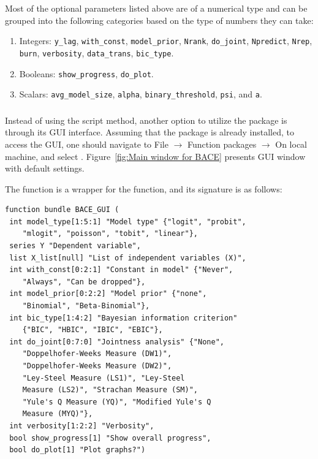 Most of the optional parameters listed above are of
a numerical type and can be grouped into the following
categories based on the type of numbers they can take:
\begin{enumerate}
	\item Integers: \lstinline!y_lag!, \lstinline!with_const!,
		\lstinline!model_prior!, \lstinline!Nrank!,
		\lstinline!do_joint!, \lstinline!Npredict!,
		\lstinline!Nrep!, \lstinline!burn!, \lstinline!verbosity!,
		\lstinline!data_trans!, \lstinline!bic_type!.
	\item Booleans: \lstinline!show_progress!, \lstinline!do_plot!.
	\item Scalars: \lstinline!avg_model_size!, \lstinline!alpha!,
		\lstinline!binary_threshold!, \lstinline!psi!, and \lstinline!a!.
\end{enumerate}


\subsubsection{}\label{sec:BACE_GUI()}
Instead of using the script method, another option to utilize
the  package is through its GUI interface. Assuming
that the package is already installed, to access the GUI,
one should navigate to File $\rightarrow$ Function packages
$\rightarrow$ On local machine, and select .
Figure~\ref{fig:Main window for BACE}
presents  GUI window with default settings.

The  function is a wrapper for the
 function, and its signature is as follows:
\begin{lstlisting}
function bundle BACE_GUI (
 int model_type[1:5:1] "Model type" {"logit", "probit",
 	"mlogit", "poisson", "tobit", "linear"},
 series Y "Dependent variable",
 list X_list[null] "List of independent variables (X)",
 int with_const[0:2:1] "Constant in model" {"Never",
 	"Always", "Can be dropped"},
 int model_prior[0:2:2] "Model prior" {"none",
 	"Binomial", "Beta-Binomial"},
 int bic_type[1:4:2] "Bayesian information criterion"
 	{"BIC", "HBIC", "IBIC", "EBIC"},
 int do_joint[0:7:0] "Jointness analysis" {"None",
	"Doppelhofer-Weeks Measure (DW1)",
	"Doppelhofer-Weeks Measure (DW2)",
	"Ley-Steel Measure (LS1)", "Ley-Steel
	Measure (LS2)", "Strachan Measure (SM)",
	"Yule's Q Measure (YQ)", "Modified Yule's Q
	Measure (MYQ)"},
 int verbosity[1:2:2] "Verbosity",
 bool show_progress[1] "Show overall progress",
 bool do_plot[1] "Plot graphs?")
\end{lstlisting}

